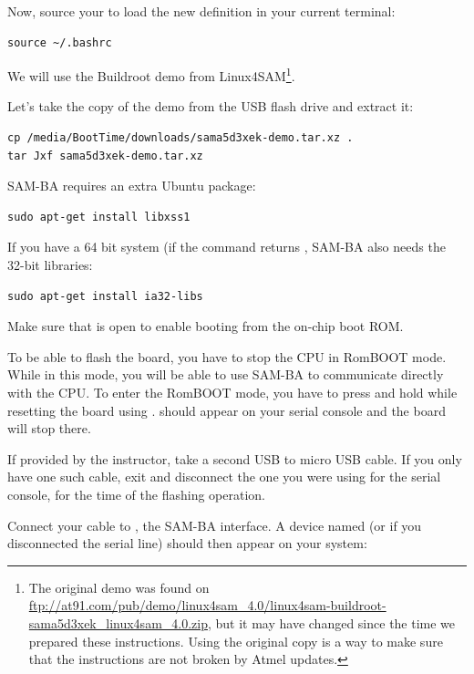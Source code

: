 Now, source your  to load the new definition in your
current terminal:
\begin{verbatim}
source ~/.bashrc
\end{verbatim}

We will use the Buildroot demo from Linux4SAM\footnote{The original demo
was found on
\url{ftp://at91.com/pub/demo/linux4sam_4.0/linux4sam-buildroot-sama5d3xek_linux4sam_4.0.zip},
but it may have changed since the time we prepared these instructions.
Using the original copy is a way to make sure that the instructions are
not broken by Atmel updates.}.

Let's take the copy of the demo from the USB flash drive and extract it:

\begin{verbatim}
cp /media/BootTime/downloads/sama5d3xek-demo.tar.xz .
tar Jxf sama5d3xek-demo.tar.xz
\end{verbatim}

SAM-BA requires an extra Ubuntu package:

\begin{verbatim}
sudo apt-get install libxss1
\end{verbatim}

If you have a 64 bit system (if the  command returns
, SAM-BA also needs the 32-bit libraries:

\begin{verbatim}
sudo apt-get install ia32-libs
\end{verbatim}

Make sure that  is open to enable booting from the 
on-chip boot ROM.

To be able to flash the board, you have to stop the CPU in RomBOOT
mode. While in this mode, you will be able to use SAM-BA to
communicate directly with the CPU. To enter the RomBOOT mode, you have to
press and hold  while resetting the board using .
 should appear on your serial console and the board will
stop there.

If provided by the instructor, take a second USB to micro USB cable.
If you only have one such cable, exit  and disconnect
the one you were using for the serial console, for the time of the
flashing operation.

Connect your cable to , the SAM-BA interface. A device named
 (or  if you disconnected the
serial line) should then appear on your system:

